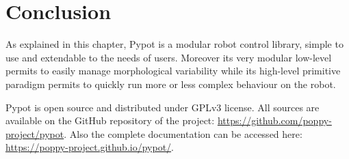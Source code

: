 \section{Conclusion} %

As explained in this chapter, Pypot is a modular robot control library, simple to use and extendable to the needs of users. Moreover its very modular low-level permits to easily manage morphological variability while its high-level primitive paradigm permits to quickly run more or less complex behaviour on the robot.

Pypot is open source and distributed under GPLv3 license. All sources are available on the GitHub repository of the project: \url{https://github.com/poppy-project/pypot}. Also the complete documentation can be accessed here: \url{https://poppy-project.github.io/pypot/}.





% 
